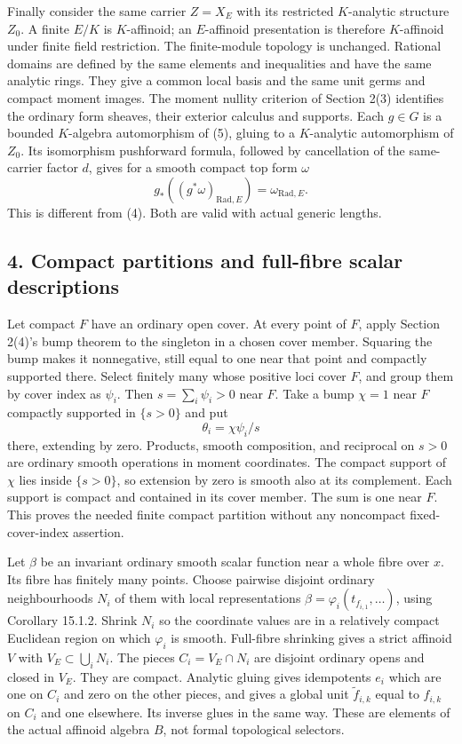 \documentclass[11pt]{article}
\begin{document}
Finally consider the same carrier \(Z=X_E\) with its restricted
\(K\)-analytic structure \(Z_0\). A finite \(E/K\) is \(K\)-affinoid; an
\(E\)-affinoid presentation is therefore \(K\)-affinoid under finite
field restriction. The finite-module topology is unchanged. Rational
domains are defined by the same elements and inequalities and have the
same analytic rings. They give a common local basis and the same unit
germs and compact moment images. The moment nullity criterion of Section
2(3) identifies the ordinary form sheaves, their exterior calculus and
supports. Each \(g\in G\) is a bounded \(K\)-algebra automorphism of
(5), gluing to a \(K\)-analytic automorphism of \(Z_0\). Its isomorphism
pushforward formula, followed by cancellation of the same-carrier factor
\(d\), gives for a smooth compact top form \(\omega\) \[
             g_*((g^*\omega)_{\mathrm{Rad},E})
                            =\omega_{\mathrm{Rad},E}.    \tag{6}
\] This is different from (4). Both are valid with actual generic
lengths.

\subsection{4. Compact partitions and full-fibre scalar
descriptions}\label{compact-partitions-and-full-fibre-scalar-descriptions}

Let compact \(F\) have an ordinary open cover. At every point of \(F\),
apply Section 2(4)'s bump theorem to the singleton in a chosen cover
member. Squaring the bump makes it nonnegative, still equal to one near
that point and compactly supported there. Select finitely many whose
positive loci cover \(F\), and group them by cover index as \(\psi_i\).
Then \(s=\sum_i\psi_i>0\) near \(F\). Take a bump \(\chi=1\) near \(F\)
compactly supported in \(\{s>0\}\) and put \[
                \theta_i=\chi\psi_i/s                  \tag{7}
\] there, extending by zero. Products, smooth composition, and
reciprocal on \(s>0\) are ordinary smooth operations in moment
coordinates. The compact support of \(\chi\) lies inside \(\{s>0\}\), so
extension by zero is smooth also at its complement. Each support is
compact and contained in its cover member. The sum is one near \(F\).
This proves the needed finite compact partition without any noncompact
fixed-cover-index assertion.

Let \(\beta\) be an invariant ordinary smooth scalar function near a
whole fibre over \(x\). Its fibre has finitely many points. Choose
pairwise disjoint ordinary neighbourhoods \(N_i\) of them with local
representations \(\beta=\varphi_i(t_{f_{i,1}},\ldots)\), using Corollary
15.1.2. Shrink \(N_i\) so the coordinate values are in a relatively
compact Euclidean region on which \(\varphi_i\) is smooth. Full-fibre
shrinking gives a strict affinoid \(V\) with \(V_E\subset\bigcup_iN_i\).
The pieces \(C_i=V_E\cap N_i\) are disjoint ordinary opens and closed in
\(V_E\). They are compact. Analytic gluing gives idempotents \(e_i\)
which are one on \(C_i\) and zero on the other pieces, and gives a
global unit \(\widetilde f_{i,k}\) equal to \(f_{i,k}\) on \(C_i\) and
one elsewhere. Its inverse glues in the same way. These are elements of
the actual affinoid algebra \(B\), not formal topological selectors.
\end{document}

